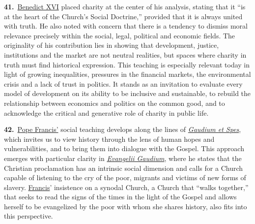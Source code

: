 \documentclass{article}
\begin{document}
\textbf{41.}\ \href{https://www.vatican.va/content/benedict-xvi/en.html}{Benedict XVI} placed charity at the center of his analysis, stating that it ``is at the heart of the Church's Social Doctrine,''\cite{n46} provided that it is always united with truth. He also noted with concern that there is a tendency to dismiss moral relevance precisely within the social, legal, political and economic fields. The originality of his contribution lies in showing that development, justice, institutions and the market are not neutral realities, but spaces where charity in truth must find historical expression. This teaching is especially relevant today in light of growing inequalities, pressures in the financial markets, the environmental crisis and a lack of trust in politics. It stands as an invitation to evaluate every model of development on its ability to be inclusive and sustainable, to rebuild the relationship between economics and politics on the common good, and to acknowledge the critical and generative role of charity in public life.

\textbf{42.}\ \href{https://www.vatican.va/content/francesco/en.html}{Pope Francis'} social teaching develops along the lines of \href{https://www.vatican.va/archive/hist_councils/ii_vatican_council/documents/vat-ii_const_19651207_gaudium-et-spes_en.html}{\emph{Gaudium et Spes}}, which invites us to view history through the lens of human hopes and vulnerabilities, and to bring them into dialogue with the Gospel. This approach emerges with particular clarity in \href{https://www.vatican.va/content/francesco/en/apost_exhortations/documents/papa-francesco_esortazione-ap_20131124_evangelii-gaudium.html}{\emph{Evangelii Gaudium}}, where he states that the Christian proclamation has an intrinsic social dimension and calls for a Church capable of listening to the cry of the poor, migrants and victims of new forms of slavery. \href{https://www.vatican.va/content/francesco/en.html}{Francis}' insistence on a synodal Church, a Church that ``walks together,'' that seeks to read the signs of the times in the light of the Gospel and allows herself to be evangelized by the poor with whom she shares history, also fits into this perspective.\cite{n47}
\end{document}

